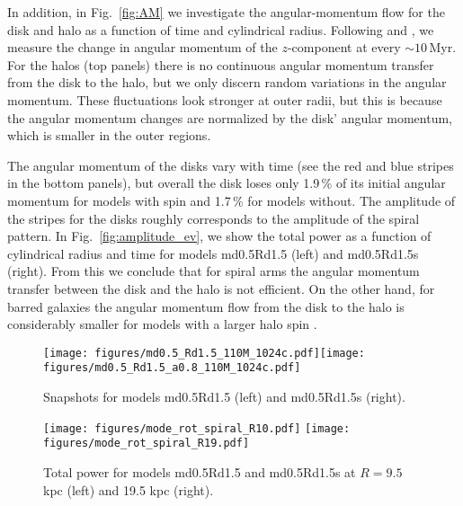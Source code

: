 In addition, in Fig.~\ref{fig:AM} we investigate the angular-momentum flow for 
the disk and halo as a function of time and cylindrical radius.
Following \citet{2014ApJ...783L..18L} and \citet{2009ApJ...707..218V},
we measure the change in angular momentum of the $z$-component at
every $\sim 10$\,Myr.
For the halos (top panels) there is no continuous angular
momentum transfer from the disk to the halo, but we only discern random variations
in the angular momentum. These fluctuations look stronger at outer
radii, but this is because the angular momentum changes are normalized by
the disk' angular momentum, which is smaller in the outer regions.

The angular momentum of the disks vary with time (see the red and blue
stripes in the bottom panels), but overall the disk loses only 1.9\,\%
of its initial angular momentum for models with spin and 1.7\,\% for
models without.
The amplitude of the stripes for the disks roughly corresponds to the
amplitude of the spiral pattern. In Fig.~\ref{fig:amplitude_ev}, we show the
total power as a function of cylindrical radius and time for models
md0.5Rd1.5 (left) and md0.5Rd1.5s (right).
From this we conclude that for spiral arms the angular momentum transfer between the disk and 
the halo is not efficient.
On the other hand, for barred galaxies the angular momentum flow 
from the disk to the halo is considerably smaller for models with 
a larger halo spin \citep[see Fig. 3 in][]{2014ApJ...783L..18L}.


\begin{figure}
\texttt{[image: figures/md0.5\_Rd1.5\_110M\_1024c.pdf]}\texttt{[image: figures/md0.5\_Rd1.5\_a0.8\_110M\_1024c.pdf]}\\
\caption{Snapshots for models md0.5Rd1.5 (left) and md0.5Rd1.5s (right). \label{fig:snapshots_spin_sp}}
\end{figure}

\begin{figure*}
  \texttt{[image: figures/mode\_rot\_spiral\_R10.pdf]}
  \texttt{[image: figures/mode\_rot\_spiral\_R19.pdf]}\\
\caption{Total power for models md0.5Rd1.5 and md0.5Rd1.5s at $R=9.5$ kpc (left) and 19.5 kpc (right). \label{fig:mode_spin_sp}}
\end{figure*}

